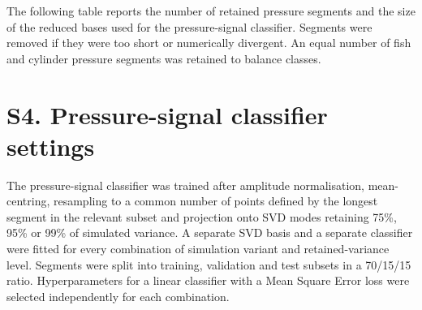 \documentclass[11pt,a4paper]{article}
\begin{document}
The following table reports the number of retained pressure segments and the size of the reduced bases used for the pressure-signal classifier. Segments were removed if they were too short or numerically divergent. An equal number of fish and cylinder pressure segments was retained to balance classes.


\begin{table}[htbp]
\centering
\caption*{Table S2. Dataset composition and dimensionality reduction for the four simulation configurations. Raw used original contours and $y$-only boundary forcing. Size-constrained applied the first-frame fish profile along the reconstructed spine and retained $y$-only forcing. X-deformation used original contours with both $x$ and $y$ boundary-motion components. Full combined the profile constraint and two-component forcing. Here, $x$ and $y$ are the fixed long and transverse tank axes.}
\end{table}

\section*{S4. Pressure-signal classifier settings}

The pressure-signal classifier was trained after amplitude normalisation, mean-centring, resampling to a common number of points defined by the longest segment in the relevant subset and projection onto SVD modes retaining 75\%, 95\% or 99\% of simulated variance. A separate SVD basis and a separate classifier were fitted for every combination of simulation variant and retained-variance level. Segments were split into training, validation and test subsets in a 70/15/15 ratio. Hyperparameters for a linear classifier with a Mean Square Error loss were selected independently for each combination.
\end{document}
